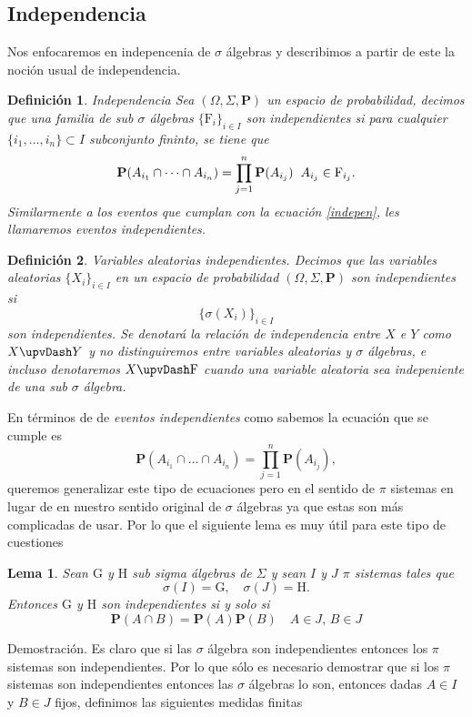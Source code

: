 \documentclass[letterpaper]{article}
\newtheorem{lema}[teorema]{Lema}
\newtheorem{def.}{Definici\'on}[section]
\newcommand{\prob}{\textbf{P}}
\newcommand{\dem}{{\noindent \sc Demostraci\'on. }}
\newcommand{\om}{\ensuremath{\Omega}}
\newcommand{\sig}{\ensuremath{\Sigma}}
\begin{document}
\subsection{Independencia}
\label{sec:org9c1e0d0}
\noindent Nos enfocaremos en indepencenia de \(\sigma\) álgebras y describimos a partir de este la noción usual de independencia.
\begin{def.}{Independencia}
Sea \((\om,\sig,\prob)\) un espacio de probabilidad, decimos que una familia de sub \(\sigma\) álgebras \(\{\mathrm{F}_i\}_{i\in I}\) son \emph{independientes} si para cualquier \(\{i_1,\dots,i_n\}\subset I\) subconjunto fininto, se tiene que
\begin{equation}\label{indepen}
    \prob(A_{i_1}\cap\dots\cap A_{i_n})=\prod_{j=1}^n\prob(A_{i_j})\hspace{0.2cm}A_{i_j}\in\mathrm{F}_{i_j}.
\end{equation}
Similarmente a los eventos que cumplan con la ecuación \ref{indepen}, les llamaremos eventos \emph{independientes}.
\end{def.}
\begin{def.}{Variables aleatorias independientes.}
Decimos que las variables aleatorias \(\{X_i\}_{i\in I}\) en un espacio de probabilidad \((\om,\sig,\prob)\) son \emph{independientes} si \[\{\sigma(X_i)\}_{i\in I}\] son independientes. Se denotará la relación de independencia entre \(X\) e \(Y\) como \(X\upvDash Y\) y no distinguiremos entre variables aleatorias y \(\sigma\) álgebras, e incluso denotaremos \(X\upvDash\mathrm{F}\) cuando una variable aleatoria sea indepeniente de una sub \(\sigma\) álgebra.
\end{def.}
En términos de de \emph{eventos independientes} como sabemos la ecuación que se cumple es
\[
    \prob(A_{i_1}\cap\dots\cap A_{i_n})=\prod_{j=1}^n\prob(A_{i_j}),
\]
\noindent queremos generalizar este tipo de ecuaciones pero en el sentido de \(\pi\) sistemas en lugar de en nuestro sentido original de \(\sigma\) álgebras ya que estas son más complicadas de usar. Por lo que el siguiente lema es muy útil para este tipo de cuestiones
\begin{lema}
Sean $\mathrm{G}$ y $\mathrm{H}$ sub sigma álgebras de $\sig$ y sean $I$ y $J$ $\pi$ sistemas tales que
\[
    \sigma(I)=\mathrm{G},\quad\sigma(J)=\mathrm{H}.
\]
Entonces $\mathrm{G}$ y $\mathrm{H}$ son independientes si y solo si
\[
    \prob(A\cap B)=\prob(A)\prob(B)\quad A\in J,\,B\in J
\]
\end{lema}
\dem
Es claro que si las \(\sigma\) álgebra son independientes entonces los \(\pi\) sistemas son independientes. Por lo que sólo es necesario demostrar que si los \(\pi\) sistemas son independientes entonces las \(\sigma\) álgebras lo son, entonces dadas \(A\in I\) y \(B\in J\) fijos, definimos las siguientes medidas finitas
\end{document}
